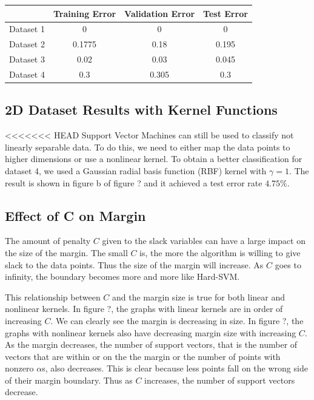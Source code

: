 \documentclass[10pt,twoside]{article}
\begin{document}
\begin{center}
 \begin{tabular}{||c c c c||} 
 \hline
  & Training Error & Validation Error & Test Error \\ [0.5ex] 
 \hline\hline
 Dataset 1 & 0 & 0 & 0 \\ 
 \hline
 Dataset 2 & 0.1775 & 0.18 & 0.195 \\
 \hline
 Dataset 3 & 0.02 & 0.03 & 0.045 \\
 \hline
 Dataset 4 & 0.3 & 0.305 & 0.3 \\
 \hline
\end{tabular}
\end{center}

\subsection{2D Dataset Results with Kernel Functions}

<<<<<<< HEAD
Support Vector Machines can still be used to classify not linearly separable data. To do this, we need to either map the data points to higher dimensions or use a nonlinear kernel. To obtain a better classification for dataset 4, we used a Gaussian radial basis function (RBF) kernel with $\gamma = 1$. The result is shown in figure b of figure ? and it achieved a test error rate $4.75\%$.


\subsection{Effect of C on Margin}
The amount of penalty $C$ given to the slack variables can have a large impact on the size of the margin. The small $C$ is, the more the algorithm is willing to give slack to the data points. Thus the size of the margin will increase. As $C$ goes to infinity, the boundary becomes more and more like Hard-SVM. 

This relationship between $C$ and the margin size is true for both linear and nonlinear kernels. In figure ?, the graphs with linear kernels are in order of increasing $C$. We can clearly see the margin is decreasing in size. In figure ?, the graphs with nonlinear kernels also have decreasing margin size with increasing $C$. As the margin decreases, the number of support vectors, that is the number of vectors that are within or on the the margin or the number of points with nonzero $\alpha$s, also decreases. This is clear because less points fall on the wrong side of their margin boundary. Thus as $C$ increases, the number of support vectors decrease. 
\end{document}
